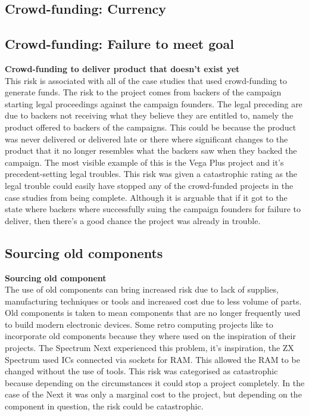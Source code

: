 \subsection{Crowd-funding: Currency}

\subsection{Crowd-funding: Failure to meet goal}
\textbf{Crowd-funding to deliver product that doesn't exist yet}\\
This risk is associated with all of the case studies that used crowd-funding to generate funds. The risk to the project comes from backers of the campaign starting legal proceedings against the campaign founders. The legal preceding are due to backers not receiving what they believe they are entitled to, namely the product offered to backers of the campaigns. This could be because the product was never delivered or delivered late or there where significant changes to the product that it no longer resembles what the backers saw when they backed the campaign. The most visible example of this is the Vega Plus project and it's precedent-setting legal troubles. This risk was given a catastrophic rating as the legal trouble could easily have stopped any of the crowd-funded projects in the case studies from being complete. Although it is arguable that if it got to the state where backers where successfully suing the campaign founders for failure to deliver, then there's a good chance the project was already in trouble.\\

\subsection{Sourcing old components}
\textbf{Sourcing old component}\\
The use of old components can bring increased risk due to lack of supplies, manufacturing techniques or tools and increased cost due to less volume of parts. Old components is taken to mean components that are no longer frequently used to build modern electronic devices. Some retro computing projects like to incorporate old components because they where used on the inspiration of their projects. The Spectrum Next experienced this problem, it's inspiration, the ZX Spectrum used ICs connected via sockets for RAM. This allowed the RAM to be changed without the use of tools. This risk was categorised as catastrophic because depending on the circumstances it could stop a project completely. In the case of the Next it was only a marginal cost to the project, but depending on the component in question, the risk could be catastrophic.\\

